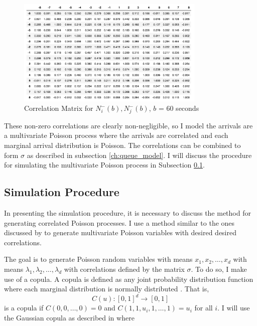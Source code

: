 \begin{figure}[t]
\begin{center}
\includegraphics[width=0.8\textwidth]{Figures/neg_neg.png}
\caption{Correlation Matrix for $N^{-}_i(b), N^{-}_j(b)$, $b$ = 60 seconds}
\label{fig:neg_neg_corr}
\end{center}
\end{figure}

These non-zero correlations are clearly non-negligible, so I model the arrivals are a multivariate Poisson process where the arrivals are correlated and each marginal arrival distribution is Poisson. The correlations can be combined to form $\sigma$ as described in subsection \ref{ch:queue_model}. I will discuss the procedure for simulating the multivariate Poisson process in Subsection \ref{ch:simulation_procedure}.

\subsection{Simulation Procedure}\label{ch:simulation_procedure}
In presenting the simulation procedure, it is necessary to discuss the method for generating correlated Poisson processes. I use a method similar to the ones discussed by \cite{A8} to generate multivariate Poisson variables with desired desired correlations. 

The goal is to generate Poisson random variables with means $x_1, x_2, \ldots, x_d$ with means $\lambda_1, \lambda_2, \ldots, \lambda_{d}$ with correlations defined by the matrix $\sigma$. To do so, I make use of a copula. A copula is defined as any joint probability distribution function where each marginal distribution is normally distributed \cite{B1}. That is, 
$$C(u): [0,1]^d \to [0,1]$$ 
is a copula if $C(0, 0, \ldots, 0) = 0$ and $C(1, 1, u_i, 1, \ldots, 1) = u_i$ for all $i$. I will use the Gaussian copula as described in \cite{A8} where

